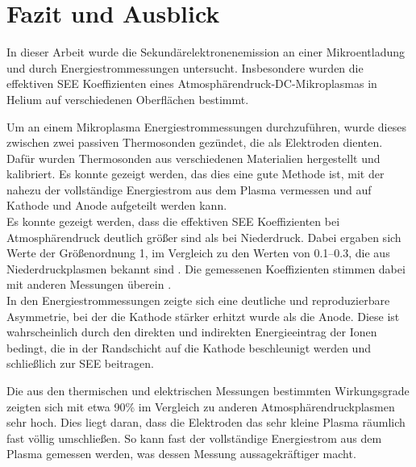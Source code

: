 \chapter{Fazit und Ausblick}

In dieser Arbeit wurde die Sekundärelektronenemission an einer Mikroentladung und durch Energiestrommessungen untersucht. Insbesondere wurden die effektiven SEE Koeffizienten eines Atmosphärendruck-DC-Mikroplasmas in Helium auf verschiedenen Oberflächen bestimmt. 

Um an einem Mikroplasma Energiestrommessungen durchzuführen, wurde dieses zwischen zwei passiven Thermosonden gezündet, die als Elektroden dienten. Dafür wurden Thermosonden aus verschiedenen Materialien hergestellt und kalibriert. Es konnte gezeigt werden, das dies eine gute Methode ist, mit der nahezu der vollständige Energiestrom aus dem Plasma vermessen und auf Kathode und Anode aufgeteilt werden kann.\\

Es konnte gezeigt werden, dass die effektiven SEE Koeffizienten bei Atmosphärendruck deutlich größer sind als bei Niederdruck. Dabei ergaben sich Werte der Größenordnung 1, im Vergleich zu den Werten von \numrange{0,1}{0,3}, die aus Niederdruckplasmen bekannt sind \cite{liebermanPrinciplesPlasmaDischarges2005,haaseDynamicDeterminationSecondary2018,bohmRetardingfieldAnalyzerMeasurements1993,toliasSecondaryElectronEmission2014, marcakNoteIoninducedSecondary2015,dakshaComputationallyAssistedSpectroscopic2016,pamperinIoninducedSecondaryElectron2018,dakshaMaterialDependentModeling2019,oechsnerElectronYieldsClean1978,guntherschulzeElektronenablosungDurchStoss1930}. Die gemessenen Koeffizienten stimmen dabei mit anderen Messungen überein \cite{hansenConventionalNonconventionalDiagnostics2022}.\\

In den Energiestrommessungen zeigte sich eine deutliche und reproduzierbare Asymmetrie, bei der die Kathode stärker erhitzt wurde als die Anode. Diese ist wahrscheinlich durch den direkten und indirekten Energieeintrag der Ionen bedingt, die in der Randschicht auf die Kathode beschleunigt werden und schließlich zur SEE beitragen.

Die aus den thermischen und elektrischen Messungen bestimmten Wirkungsgrade zeigten sich mit etwa 90\% im Vergleich zu anderen Atmosphärendruckplasmen sehr hoch. Dies liegt daran, dass die Elektroden das sehr kleine Plasma räumlich fast völlig umschließen. So kann fast der vollständige Energiestrom aus dem Plasma gemessen werden, was dessen Messung aussagekräftiger macht.
\\

